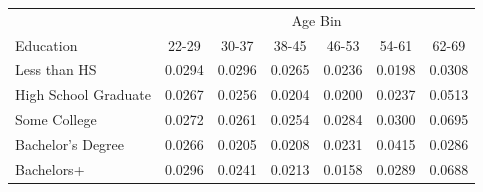 \begin{tabular}{lcccccc}
\hline\hline
 & \multicolumn{6}{c}{Age Bin} \\
Education & 22-29 & 30-37 & 38-45 & 46-53 & 54-61 & 62-69 \\
\hline
Less than HS&0.0294&0.0296&0.0265&0.0236&0.0198&0.0308\\
High School Graduate&0.0267&0.0256&0.0204&0.0200&0.0237&0.0513\\
Some College&0.0272&0.0261&0.0254&0.0284&0.0300&0.0695\\
Bachelor's Degree&0.0266&0.0205&0.0208&0.0231&0.0415&0.0286\\
Bachelors+&0.0296&0.0241&0.0213&0.0158&0.0289&0.0688\\
\hline\hline
\end{tabular}
